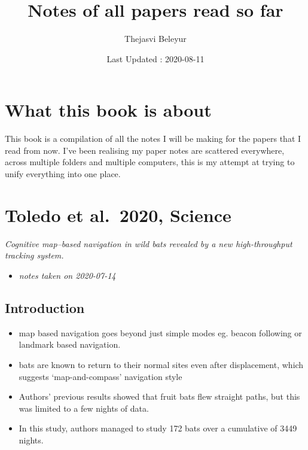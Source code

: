 \documentclass[
]{book}
\title{Notes of all papers read so far}
\author{Thejasvi Beleyur}
\date{Last Updated : 2020-08-11}
\providecommand{\tightlist}{%
  \setlength{\itemsep}{0pt}\setlength{\parskip}{0pt}}
\begin{document}
\maketitle

{
\setcounter{tocdepth}{1}
\tableofcontents
}
\hypertarget{what-this-book-is-about}{%
\chapter*{What this book is about}\label{what-this-book-is-about}}

This book is a compilation of all the notes I will be making for the papers that I read from now.
I've been realising my paper notes are scattered everywhere, across multiple folders and multiple computers,
this is my attempt at trying to unify everything into one place.

\hypertarget{toledo-et-al.-2020-science}{%
\chapter{Toledo et al.~2020, Science}\label{toledo-et-al.-2020-science}}


\emph{Cognitive map--based navigation in wild bats revealed by a new high-throughput tracking system.} \citep{toledo2020cognitive}

\begin{itemize}
\tightlist
\item
  \emph{notes taken on 2020-07-14}
\end{itemize}

\hypertarget{introduction}{%
\section{Introduction}\label{introduction}}

\begin{itemize}
\tightlist
\item
  map based navigation goes beyond just simple modes eg. beacon following or landmark based navigation.
\item
  bats are known to return to their normal sites even after displacement, which suggests `map-and-compass' navigation style
\item
  Authors' previous results showed that fruit bats flew straight paths, but this was limited to a few nights of data.
\item
  In this study, authors managed to study 172 bats over a cumulative of 3449 nights.
\end{itemize}
\end{document}

